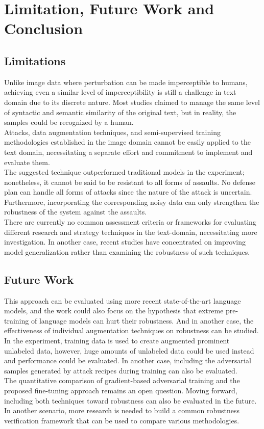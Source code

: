 \documentclass[%
	BCOR=8mm, %
	DIV=12,
	toc=bibliography, %
	toc=listof, %
	oneside, %
	egregdoesnotlikesansseriftitles, %
	]{scrbook}
\begin{document}
\chapter{Limitation, Future Work and Conclusion}
\label{chapter:conclusion}

\section{Limitations}
\label{section:limitations}
Unlike image data where perturbation can be made imperceptible to humans, achieving even a similar level of imperceptibility is still a challenge in text domain due to its discrete nature. Most studies claimed to manage the same level of syntactic and semantic similarity of the original text, but in reality, the samples could be recognized by a human.\\
Attacks, data augmentation techniques, and semi-supervised training methodologies established in the image domain cannot be easily applied to the text domain, necessitating a separate effort and commitment to implement and evaluate them.\\
The suggested technique outperformed traditional models in the experiment; nonetheless, it cannot be said to be resistant to all forms of assaults. No defense plan can handle all forms of attacks since the nature of the attack is uncertain. Furthermore, incorporating the corresponding noisy data can only strengthen the robustness of the system against the assaults.\\
There are currently no common assessment criteria or frameworks for evaluating different research and strategy techniques in the text-domain, necessitating more investigation. In another case, recent studies have concentrated on improving model generalization rather than examining the robustness of such techniques.


\section{Future Work }
\label{section:futurework}
This approach can be evaluated using more recent state-of-the-art language models, and the work could also focus on the hypothesis that extreme pre-training of language models can hurt their robustness. And in another case, the effectiveness of individual augmentation techniques on robustness can be studied.\\
In the experiment, training data is used to create augmented prominent unlabeled data, however,  huge amounts of unlabeled data could be used instead and performance could be evaluated. In another case, including the adversarial samples generated by attack recipes during training can also be evaluated. \\
The quantitative comparison of gradient-based adversarial training and the proposed fine-tuning approach remains an open question. Moving forward, including both techniques toward robustness can also be evaluated in the future. \\
In another scenario, more research is needed to build a common robustness verification framework that can be used to compare various methodologies.
 
\end{document}
